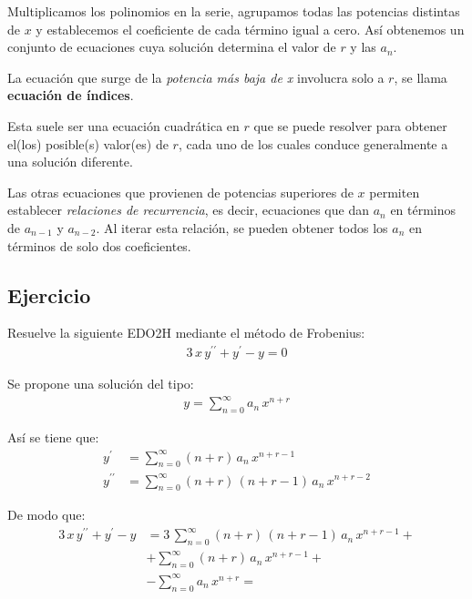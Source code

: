 Multiplicamos los polinomios en la serie, agrupamos todas las potencias distintas de $x$ y establecemos el coeficiente de cada término igual a cero. Así obtenemos un conjunto de ecuaciones cuya solución determina el valor de $r$ y las $a_{n}$.

La ecuación que surge de la \emph{potencia más baja de x} involucra solo a $r$, se llama \textbf{ecuación de índices}.

Esta suele ser una ecuación cuadrática en $r$ que se puede resolver para obtener el(los) posible(s) valor(es) de $r$, cada uno de los cuales conduce generalmente a una solución diferente.

Las otras ecuaciones que provienen de potencias superiores de $x$ permiten establecer \emph{relaciones de recurrencia}, es decir, ecuaciones que dan $a_{n}$ en términos de $a_{n-1}$ y $a_{n-2}$. Al iterar esta relación, se pueden obtener todos los $a_{n}$ en términos de solo dos coeficientes.

\subsection{Ejercicio}

Resuelve la siguiente EDO2H mediante el método de Frobenius:
\begin{align}
3 \, x \, y^{\prime \prime} + y^{\prime} - y = 0
\label{eq:ecuacion_04}    
\end{align}

Se propone una solución del tipo:
\begin{align*}
y = \sum_{n=0}^{\infty} a_{n} \, x^{n+r}
\end{align*}

Así se tiene que:
\begin{align*}
y^{\prime} &= \sum_{n=0}^{\infty} (n + r) \, a_{n} \, x^{n+r-1} \\[0.5em]
y^{\prime \prime} &= \sum_{n=0}^{\infty} (n + r) \, (n + r - 1) \, a_{n} \, x^{n+r-2}
\end{align*}

De modo que:
\begin{align*}
3 \, x \, y^{\prime \prime} + y^{\prime} - y &= 3 \, \sum_{n=0}^{\infty} (n + r) \, (n + r - 1) \, a_{n} \, x^{n+r-1} + \\[0.5em]
&+ \sum_{n=0}^{\infty} (n + r) \, a_{n} \, x^{n+r-1} + \\[0.5em]
&- \sum_{n=0}^{\infty} a_{n} \, x^{n+r} =
\end{align*}

